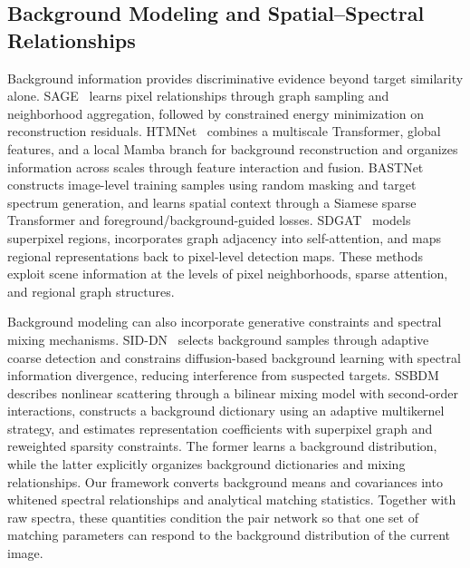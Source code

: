 \documentclass[a4paper,11pt]{article}
\begin{document}
\subsection{Background Modeling and Spatial--Spectral Relationships}
Background information provides discriminative evidence beyond target similarity alone. SAGE~\cite{sage2025} learns pixel relationships through graph sampling and neighborhood aggregation, followed by constrained energy minimization on reconstruction residuals. HTMNet~\cite{htmnet2025} combines a multiscale Transformer, global features, and a local Mamba branch for background reconstruction and organizes information across scales through feature interaction and fusion. BASTNet~\cite{bastnet2025} constructs image-level training samples using random masking and target spectrum generation, and learns spatial context through a Siamese sparse Transformer and foreground/background-guided losses. SDGAT~\cite{sdgat2026} models superpixel regions, incorporates graph adjacency into self-attention, and maps regional representations back to pixel-level detection maps. These methods exploit scene information at the levels of pixel neighborhoods, sparse attention, and regional graph structures.

Background modeling can also incorporate generative constraints and spectral mixing mechanisms. SID-DN~\cite{siddn2025} selects background samples through adaptive coarse detection and constrains diffusion-based background learning with spectral information divergence, reducing interference from suspected targets. SSBDM~\cite{ssbdm2026} describes nonlinear scattering through a bilinear mixing model with second-order interactions, constructs a background dictionary using an adaptive multikernel strategy, and estimates representation coefficients with superpixel graph and reweighted sparsity constraints. The former learns a background distribution, while the latter explicitly organizes background dictionaries and mixing relationships. Our framework converts background means and covariances into whitened spectral relationships and analytical matching statistics. Together with raw spectra, these quantities condition the pair network so that one set of matching parameters can respond to the background distribution of the current image.
\end{document}
